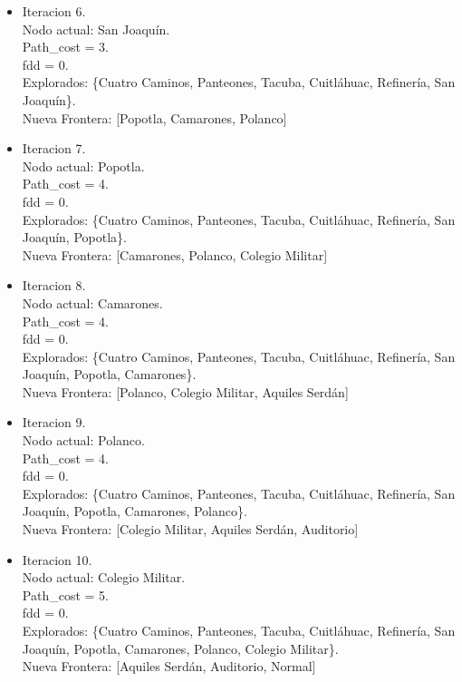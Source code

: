 \documentclass[10pt,a4paper]{article}
\begin{document}
\begin{itemize}
    \item Iteracion 6.\\
    Nodo actual: San Joaquín.\\
    Path\_cost = 3.\\
    fdd = 0.\\
    Explorados: \{Cuatro Caminos, Panteones, Tacuba, Cuitláhuac, Refinería, San Joaquín\}.\\
    Nueva Frontera: [Popotla, Camarones, Polanco]

    \item Iteracion 7.\\
    Nodo actual: Popotla.\\
    Path\_cost = 4.\\
    fdd = 0.\\
    Explorados: \{Cuatro Caminos, Panteones, Tacuba, Cuitláhuac, Refinería, San Joaquín, Popotla\}.\\
    Nueva Frontera: [Camarones, Polanco, Colegio Militar]

    \item Iteracion 8.\\
    Nodo actual: Camarones.\\
    Path\_cost = 4.\\
    fdd = 0.\\
    Explorados: \{Cuatro Caminos, Panteones, Tacuba, Cuitláhuac, Refinería, San Joaquín, Popotla, Camarones\}.\\
    Nueva Frontera: [Polanco, Colegio Militar, Aquiles Serdán]

    \item Iteracion 9.\\
    Nodo actual: Polanco.\\
    Path\_cost = 4.\\
    fdd = 0.\\
    Explorados: \{Cuatro Caminos, Panteones, Tacuba, Cuitláhuac, Refinería, San Joaquín, Popotla, Camarones, Polanco\}.\\
    Nueva Frontera: [Colegio Militar, Aquiles Serdán, Auditorio]

    \item Iteracion 10.\\
    Nodo actual: Colegio Militar.\\
    Path\_cost = 5.\\
    fdd = 0.\\
    Explorados: \{Cuatro Caminos, Panteones, Tacuba, Cuitláhuac, Refinería, San Joaquín, Popotla, Camarones, Polanco, Colegio Militar\}.\\
    Nueva Frontera: [Aquiles Serdán, Auditorio, Normal]


\end{itemize}
\end{document}
